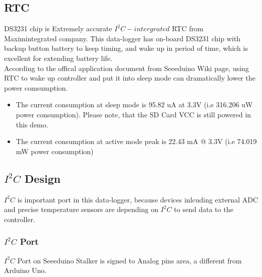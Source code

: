 
  
  \subsection{RTC}
    DS3231 chip is Extremely accurate $I^{2}C-intergrated$ RTC from Maximintegrated company. This data-logger has on-board DS3231 chip with backup button battery to keep timing, and wake up in period of time, which is excellent for extending battery life.  \\
    According to the offical application document from Seeeduino Wiki page, using RTC to wake up controller and put it into sleep mode can dramatically lower the power comsumption.
    \begin{framed}
            \begin{itemize}
            \item The current consumption at sleep mode is 95.82 uA at 3.3V (i.e 316.206 uW power consumption). Please note, that the SD Card VCC is still powered in this demo. 
            \item The current consumption at active mode peak is 22.43 mA @ 3.3V (i.e 74.019 mW power consumption)
            \end{itemize}
    \end{framed}


  \subsection{$I^{2}C$ Design}
    \label{i2c Design}
    $I^{2}C$ is important port in this data-logger, because devices inlcuding external ADC and precise temperature sensors are depending on $I^{2}C$ to send data to the controller. \\
    
    \subsubsection{$I^{2}C$ Port}
    $I^{2}C$ Port on Seeeduino Stalker is signed to Analog pins area, a different from Arduino Uno.
    
